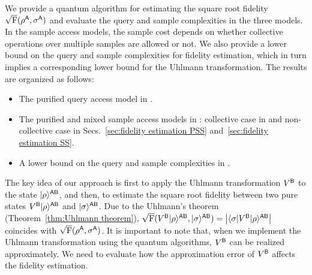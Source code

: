 



\label{sec:fidelity estimation}









We provide a quantum algorithm for estimating the square root fidelity $\sqrt{{\mathrm{F}}}(\rho^{\mathsf{A}}, \sigma^{\mathsf{A}})$ and evaluate the query and sample complexities in the three models.
In the sample access models, the sample cost depends on whether collective operations over multiple samples are allowed or not. We also provide a lower bound on the query and sample complexities for fidelity estimation, which in turn implies a corresponding lower bound for the Uhlmann transformation. The results are organized as follows:
\begin{itemize}
    \item The purified query access model in .
    \item The purified and mixed sample access models in : collective case in  and non-collective case in Secs.~\ref{sec:fidelity estimation PSS} and~\ref{sec:fidelity estimation SS}.
    \item A lower bound on the query and sample complexities in .
\end{itemize}





The key idea of our approach is first to apply the Uhlmann transformation $V^{\mathsf{B}}$ to the state $|\rho\rangle^{{\mathsf{A}}{\mathsf{B}}}$, and then, to estimate the square root fidelity between two pure states $V^{\mathsf{B}}|\rho\rangle^{{\mathsf{A}}{\mathsf{B}}}$ and $|\sigma\rangle^{{\mathsf{A}}{\mathsf{B}}}$.
Due to the Uhlmann's theorem (Theorem~\ref{thm:Uhlmann theorem}), $\sqrt{{\mathrm{F}}}(V^{\mathsf{B}}|\rho\rangle^{{\mathsf{A}}{\mathsf{B}}}, |\sigma\rangle^{{\mathsf{A}}{\mathsf{B}}}) = \big|\langle\sigma|V^{\mathsf{B}}|\rho\rangle^{{\mathsf{A}}{\mathsf{B}}}\big|$ coincides with $\sqrt{{\mathrm{F}}}(\rho^{\mathsf{A}}, \sigma^{\mathsf{A}})$.
It is important to note that, when we implement the Uhlmann transformation using the quantum algorithms, $V^{\mathsf{B}}$ can be realized approximately.
We need to evaluate how the approximation error of $V^{\mathsf{B}}$ affects the fidelity estimation.


